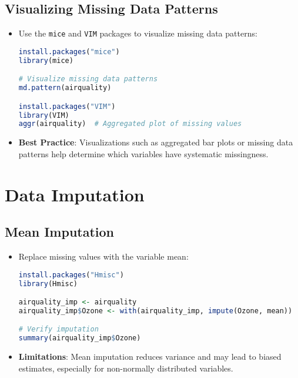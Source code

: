 \documentclass{article}
\begin{document}
\subsection{Visualizing Missing Data Patterns}
\begin{itemize}
    \item Use the \texttt{mice} and \texttt{VIM} packages to visualize missing data patterns:
\begin{lstlisting}[language=R]
install.packages("mice")
library(mice)

# Visualize missing data patterns
md.pattern(airquality)

install.packages("VIM")
library(VIM)
aggr(airquality)  # Aggregated plot of missing values
\end{lstlisting}

\item \textbf{Best Practice}: Visualizations such as aggregated bar plots or missing data patterns help determine which variables have systematic missingness.
\end{itemize}

\section{Data Imputation}
\subsection{Mean Imputation}
\begin{itemize}
    \item Replace missing values with the variable mean:
\begin{lstlisting}[language=R]
install.packages("Hmisc")
library(Hmisc)

airquality_imp <- airquality
airquality_imp$Ozone <- with(airquality_imp, impute(Ozone, mean))

# Verify imputation
summary(airquality_imp$Ozone)
\end{lstlisting}

\item \textbf{Limitations}: Mean imputation reduces variance and may lead to biased estimates, especially for non-normally distributed variables.
\end{itemize}
\end{document}
